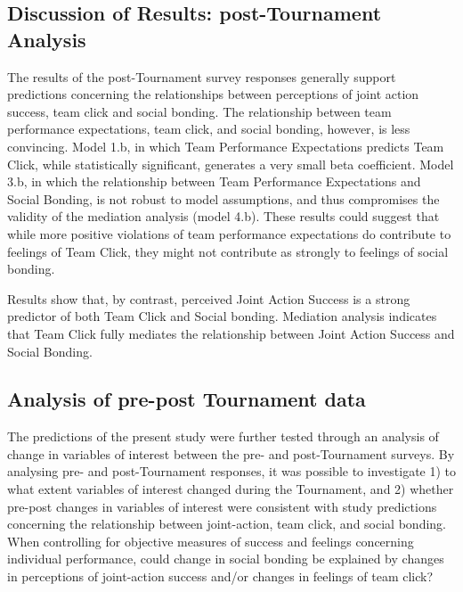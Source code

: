 \subsection{Discussion of Results: post-Tournament Analysis}
The results of the post-Tournament survey responses generally support predictions concerning the relationships between perceptions of joint action success, team click and social bonding.  The relationship between team performance expectations, team click, and social bonding, however, is less convincing.  Model 1.b, in which Team Performance Expectations predicts Team Click, while statistically significant, generates a very small beta coefficient.  Model 3.b, in which the relationship between Team Performance Expectations and Social Bonding, is not robust to model assumptions, and thus compromises the validity of the mediation analysis (model 4.b).  These results could suggest that while more positive violations of team performance expectations do contribute to feelings of Team Click, they might not contribute as strongly to feelings of social bonding.

Results show that, by contrast, perceived Joint Action Success is a strong predictor of both Team Click and Social bonding. Mediation analysis indicates that Team Click fully mediates the relationship between Joint Action Success and Social Bonding.


































\clearpage
\subsection{Analysis of pre-post Tournament data}
The predictions of the present study were further tested through an analysis of change in variables of interest between the pre- and post-Tournament surveys. By analysing pre- and post-Tournament responses, it was possible to investigate 1) to what extent variables of interest changed during the Tournament, and 2) whether pre-post changes in variables of interest were consistent with study predictions concerning the relationship between joint-action, team click, and social bonding.  When controlling for objective measures of success and feelings concerning individual performance, could change in social bonding be explained by changes in perceptions of joint-action success and/or changes in feelings of team click?




